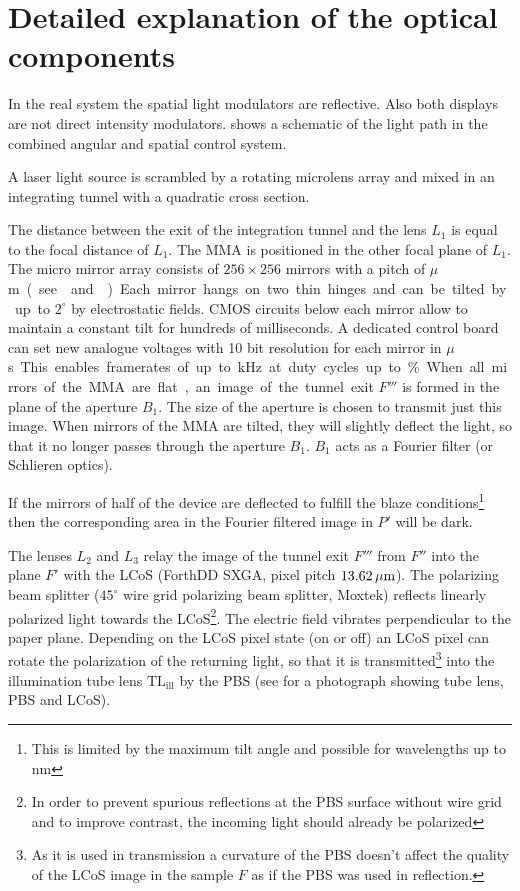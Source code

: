 \section{Detailed explanation of the optical components}

In the real system the spatial light modulators are reflective. 
Also both displays are not direct intensity modulators.
 shows a schematic of the light path in
the combined angular and spatial control system.

A laser light source is scrambled by a rotating microlens array and
mixed in an integrating tunnel with a quadratic cross section.

The distance between the exit of the integration tunnel and the lens
$L_1$ is equal to the focal distance of $L_1$. The MMA is positioned
in the other focal plane of $L_1$. The micro mirror array consists of
$256\times 256$ mirrors with a pitch of \unit[16]{$\mu$m} (see
 and ). Each mirror hangs on
two thin hinges and can be tilted by up to $2^\circ$ by electrostatic
fields. CMOS circuits below each mirror allow to maintain a constant
tilt for hundreds of milliseconds. A dedicated control board can set
new analogue voltages with 10 bit resolution for each mirror in
\unit[850]{$\mu$s}. This enables framerates of up to \unit[1]{kHz} at
duty cycles up to \unit[50]{\%}.

When all mirrors of the MMA are flat, an image of the tunnel exit $F'''$
is formed in the plane of the aperture $B_1$. The size of the aperture
is chosen to transmit just this image. When mirrors of the MMA are
tilted, they will slightly deflect the light, so that it no longer
passes through the aperture $B_1$. $B_1$ acts as a Fourier filter (or
Schlieren optics).

If the mirrors of half of the device are deflected to fulfill the
blaze conditions\footnote{This is limited by the maximum tilt angle
  and possible for wavelengths up to \unit[800]{nm}} then the
corresponding area in the Fourier filtered image in $P'$ will be dark.

The lenses $L_2$ and $L_3$ relay the image of the tunnel exit $F'''$
from $F''$ into the plane $F'$ with the LCoS (ForthDD SXGA, pixel
pitch $\unit[13.62]{\mu m}$). The polarizing beam splitter ($45^\circ$
wire grid polarizing beam splitter, Moxtek) reflects linearly
polarized light towards the LCoS\footnote{In order to prevent spurious
  reflections at the PBS surface without wire grid and to improve
  contrast, the incoming light should already be polarized}. The
electric field vibrates perpendicular to the paper plane. Depending on
the LCoS pixel state (on or off) an LCoS pixel can rotate the
polarization of the returning light, so that it is
transmitted\footnote{As it is used in transmission a curvature of the
  PBS doesn't affect the quality of the LCoS image in the sample $F$
  as if the PBS was used in reflection.}  into the illumination tube
lens $\textrm{TL}_\textrm{ill}$ by the PBS (see  for
a photograph showing tube lens, PBS and LCoS).

